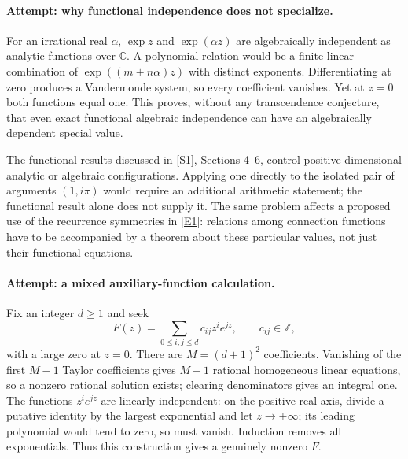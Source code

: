 \documentclass[11pt,a4paper]{article}
\newcommand{\Z}{\mathbb{Z}}
\newcommand{\C}{\mathbb{C}}
\newcommand{\sref}[2]{\hyperlink{source:#1:#2}{[S#2]}}
\newcommand{\eref}[2]{\hyperlink{extra:#1:#2}{[E#2]}}
\numberwithin{equation}{section}
\begin{document}
\paragraph{Attempt: why functional independence does not specialize.}
For an irrational real $\alpha$, $\exp z$ and $\exp(\alpha z)$ are
algebraically independent as analytic functions over $\C$. A polynomial
relation would be a finite linear combination of
$\exp((m+n\alpha)z)$ with distinct exponents. Differentiating at zero
produces a Vandermonde system, so every coefficient vanishes. Yet at
$z=0$ both functions equal one. This proves, without any transcendence
conjecture, that even exact functional algebraic independence can have
an algebraically dependent special value.

The functional results discussed in \sref{3349}{1}, Sections 4--6,
control positive-dimensional analytic or algebraic configurations.
Applying one directly to the isolated pair of arguments $(1,i\pi)$
would require an additional arithmetic statement; the functional
result alone does not supply it. The same problem affects a proposed
use of the recurrence symmetries in \eref{3349}{1}: relations among
connection functions have to be accompanied by a theorem about these
particular values, not just their functional equations.

\paragraph{Attempt: a mixed auxiliary-function calculation.}
Fix an integer $d\geq1$ and seek
\begin{equation}
 F(z)=\sum_{0\leq i,j\leq d}c_{ij}z^i e^{jz},
 \qquad c_{ij}\in\Z,
\end{equation}
with a large zero at $z=0$. There are $M=(d+1)^2$ coefficients.
Vanishing of the first $M-1$ Taylor coefficients gives $M-1$ rational
homogeneous linear equations, so a nonzero rational solution exists;
clearing denominators gives an integral one. The functions $z^ie^{jz}$
are linearly independent: on the positive real axis, divide a putative
identity by the largest exponential and let $z\to+\infty$; its leading
polynomial would tend to zero, so must vanish. Induction removes all
exponentials. Thus this construction gives a genuinely nonzero $F$.
\end{document}
